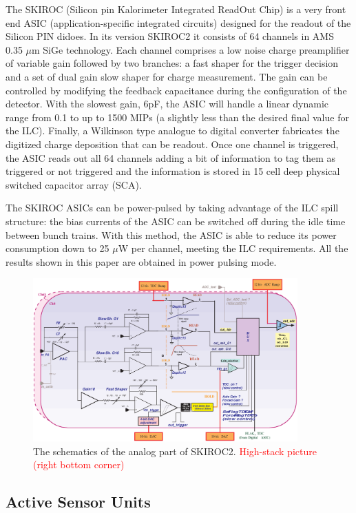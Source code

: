 \documentclass[final,3p,times,twocolumn]{elsarticle}
\newcommand{\todo}[1]{\textcolor{red}{{#1}}}
\begin{document}
The SKIROC\cite{Callier:2011zz} (Silicon pin Kalorimeter Integrated ReadOut Chip) is a
very front end ASIC (application-specific integrated circuits)
designed for the readout of the Silicon PIN didoes.
In its version SKIROC2 it consists of 64 channels in AMS 0.35 $\mu$m SiGe technology.
Each channel comprises a low noise charge preamplifier of variable gain followed by two branches:
a fast shaper for the trigger decision and a set of dual gain slow shaper for charge measurement. 
The gain can be controlled by modifying the feedback capacitance during the configuration of the detector.
With the slowest gain, 6pF, the ASIC will handle a linear dynamic range from 0.1 to up to 1500 MIPs 
(a slightly less than the desired final value for the ILC). 
Finally, a Wilkinson type analogue to digital converter fabricates the digitized charge deposition that can be readout. 
Once one channel is triggered, the ASIC reads out all 64 channels adding a bit of information to tag them as
triggered or not triggered and the information is stored in 15 cell deep physical switched capacitor array (SCA).

The SKIROC ASICs can be power-pulsed by taking advantage of the ILC spill structure: 
the bias currents of the ASIC can be switched off during the idle time between bunch trains.
With this method, the ASIC is able to reduce its power consumption down to 25 $\mu$W per channel,
meeting the ILC requirements. All the results shown in this paper are obtained in power pulsing mode.

\begin{figure}[!t]
  \centering
    \includegraphics[width=4in]{../figs/skiroc2_block.eps}
\caption{The schematics of the analog part of SKIROC2. \todo{High-stack picture (right bottom corner)}}
\label{SKIROC2}
\end{figure}

\subsection{Active Sensor Units}
\label{sec:ASU}
\end{document}
